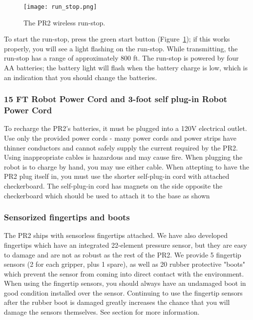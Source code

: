 \begin{figure}[h]
\centering
\texttt{[image: run\_stop.png]}
\caption{The PR2 wireless run-stop.}
\label{fig:runstop}
\end{figure}

To start the run-stop, press the green start button (Figure~\ref{fig:runstop}); if this works properly, you will see a 
light flashing on the run-stop. While transmitting, the run-stop has a range of approximately 800 ft. The run-stop is 
powered by four AA batteries; the battery light will flash when the battery charge is low, which is an indication that 
you should change the batteries.

\subsubsection{15 FT Robot Power Cord and 3-foot self plug-in Robot Power Cord}
To recharge the PR2's batteries, it must be plugged into a 120V electrical outlet.  Use only the provided power cords - many power cords and power strips have thinner conductors and cannot safely supply the current required by the PR2.  Using inappropriate cables is hazardous and may cause fire.  When plugging the robot is to charge by hand, you may use either cable.  When attepting to have the PR2 plug itself in, you must use the shorter self-plug-in cord with attached checkerboard.  The self-plug-in cord has magnets on the side opposite the checkerboard which should be used to attach it to the base as shown 

\subsubsection{Sensorized fingertips and boots}
The PR2 ships with sensorless fingertips attached.  We have also developed fingertips which have an integrated 22-element pressure sensor, but they are easy to damage and are not as robust as the rest of the PR2.  We provide 5 fingertip sensors (2 for each gripper, plus 1 spare), as well as 20 rubber protective "boots" which prevent the sensor from coming into direct contact with the environment.  When using the fingertip sensors, you should always have an undamaged boot in good condition installed over the sensor.  Continuing to use the fingertip sensors after the rubber boot is damaged greatly increases the chance that you will damage the sensors themselves.  See section  for more information.

